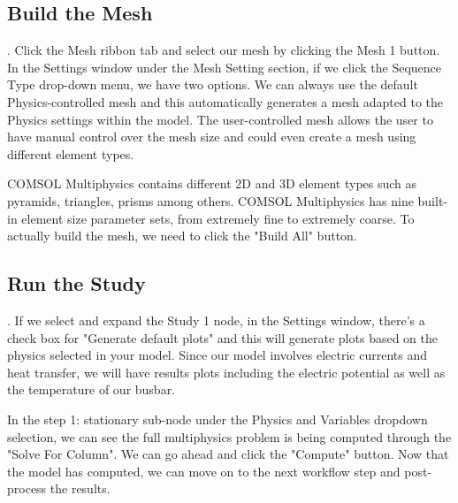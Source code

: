 \subsection{Build the Mesh}.
Click the Mesh ribbon tab and select our mesh by clicking the Mesh 1 button. In the Settings window under the Mesh Setting section, if we click the Sequence Type drop-down menu, we have two options. We can always use the default Physics-controlled mesh and this automatically generates a mesh adapted to the Physics settings within the model. The user-controlled mesh allows the user to have manual control over the mesh size and could even create a mesh using different element types.

COMSOL Multiphysics contains different 2D and 3D element types such as pyramids, triangles, prisms among others. COMSOL Multiphysics has nine built-in element size parameter sets, from extremely fine to extremely coarse. To actually build the mesh, we need to click the "Build All" button.


\subsection{Run the Study}.
If we select and expand the Study 1 node, in the Settings window, there's a check box for "Generate default plots" and this will generate plots based on the physics selected in your model. Since our model involves electric currents and heat transfer, we will have results plots including the electric potential as well as the temperature of our busbar.


In the step 1: stationary sub-node under the Physics and Variables dropdown selection, we can see the full multiphysics problem is being computed through the "Solve For Column". We can go ahead and click the "Compute" button. Now that the model has computed, we can move on to the next workflow step and post-process the results.

